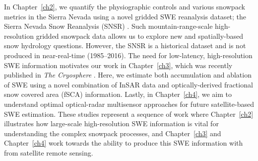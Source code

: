 In Chapter~\ref{ch2}, we quantify the physiographic controls and various snowpack metrics in the Sierra Nevada using a novel gridded SWE reanalysis dataset; the Sierra Nevada Snow Reanalysis (SNSR) \citep{margulisLandsatEraSierraNevada2016}. Such mountain-range-scale high-resolution gridded snowpack data allows us to explore new and spatially-based snow hydrology questions. However, the SNSR is a historical dataset and is not produced in near-real-time (1985--2016). The need for low-latency, high-resolution SWE information motivates our work in Chapter~\ref{ch3}, which was recently published in \emph{The Cryosphere} \citep{tarriconeEstimatingSnowAccumulation2023a}. Here, we estimate both accumulation and ablation of SWE using a novel combination of InSAR data and optically-derived fractional snow covered area (fSCA) information. Lastly, in Chapter~\ref{ch4}, we aim to understand optimal optical-radar multisensor approaches for future satellite-based SWE estimation. These studies represent a sequence of work where Chapter~\ref{ch2} illustrates how large-scale high-resolution SWE information is vital for understanding the complex snowpack processes, and Chapter~\ref{ch3} and Chapter~\ref{ch4} work towards the ability to produce this SWE information with from satellite remote sensing.




